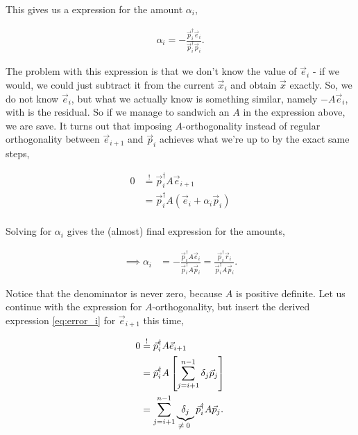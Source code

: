 \documentclass{article}
\theoremstyle{plain} %
\theoremstyle{convention} %
\theoremstyle{remark} %
\numberwithin{equation}{section}
\begin{document}
This gives us a expression for the amount $\alpha_i$,

\begin{align*}
    \alpha_i = - \frac{ \vec{p}_i^{\dagger} \vec{e}_{i} }{ \vec{p}_i^{\dagger} \vec{p}_i }.
\end{align*}

The problem with this expression is that we don't know the value of $\vec{e}_i$ - if we would, we could just subtract it from the current $\vec{x}_i$ and obtain $\vec{x}$ exactly. So, we do not know $\vec{e}_i$, but what we actually know is something similar, namely $-A \vec{e}_i$, with is the residual. So if we manage to sandwich an $A$ in the expression above, we are save. It turns out that imposing $A$-orthogonality instead of regular orthogonality between $\vec{e}_{i+1}$ and $\vec{p}_i$ achieves what we're up to by the exact same steps\footnotemark,

\begin{align*}
    0 &\stackrel{!}{=} \vec{p}_i^{\dagger} A \vec{e}_{i+1} \\
                    &= \vec{p}_i^{\dagger} A ( \vec{e}_{i} + \alpha_i \vec{p}_i ) \\
\end{align*}


Solving for $\alpha_i$ gives the (almost) final expression for the amounts,

\begin{align}
      \implies         \alpha_i &= - \frac{ \vec{p}_i^{\dagger} A \vec{e}_{i} }{ \vec{p}_i^{\dagger} A \vec{p}_i } = \frac{ \vec{p}_i^{\dagger} \vec{r}_{i} }{ \vec{p}_i^{\dagger} A \vec{p}_i }. \label{eq:cgne:alpha_pre}
\end{align}

Notice that the denominator is never zero, because $A$ is positive definite. Let us continue with the expression for $A$-orthogonality, but insert the derived expression \eqref{eq:error_i} for $\vec{e}_{i+1}$ this time,

\begin{align*}
    0 &\stackrel{!}{=} \vec{p}_i^{\dagger} A \vec{e}_{i+1} \\
                    &= \vec{p}_i^{\dagger} A \left[ \sum_{j=i+1}^{n-1} \delta_j \vec{p}_j \right] \\
                    &= \sum_{j=i+1}^{n-1} \underbrace{ \delta_j }_{\text{\makebox[0pt]{$\neq 0$} }} \vec{p}_i^{\dagger} A \vec{p}_j.
\end{align*}
\end{document}
